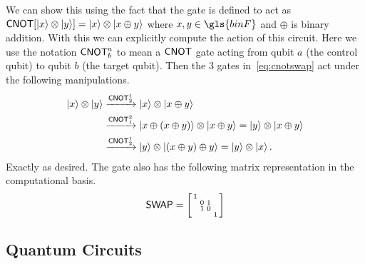 \begin{example}
    We can show this using the fact that the \CNOT{} gate is defined to act as $\mathsf{CNOT}\qty[\ket{x}\otimes\ket{y}] = \ket{x} \otimes \ket{x\oplus y}$ where $x, y \in \gls{binF}$ and $\oplus$ is binary addition.
    With this we can explicitly compute the action of this circuit.
    Here we use the notation $\mathsf{CNOT}^a_b$ to mean a $\mathsf{CNOT}{}$ gate acting from qubit $a$ (the control qubit) to qubit $b$ (the target qubit).
    Then the 3 \CNOT{} gates in~\cref{eq:cnotswap} act under the following manipulations.
    \begin{align*}
        \ket{x}\otimes\ket{y} & \xrightarrow{\mathsf{CNOT}^1_2} \ket{x}\otimes\ket{x\oplus y}                                                     \\
                              & \xrightarrow{\mathsf{CNOT}^2_1} \ket{x\oplus (x\oplus y)}\otimes \ket{x\oplus y}  = \ket{y}\otimes\ket{x\oplus y} \\
                              & \xrightarrow{\mathsf{CNOT}^1_2} \ket{y}\otimes\ket{(x\oplus y)\oplus y} = \ket{y}\otimes \ket{x}.
    \end{align*}
    Exactly as desired.
    The \SWAP{} gate also has the following matrix representation in the computational basis.
    \begin{equation}
        \SWAP = \smqty[1 & & & \\ & 0 & 1 & \\ & 1 & 0 & \\ & & & 1]
    \end{equation}
\end{example}

\subsection{Quantum Circuits}

